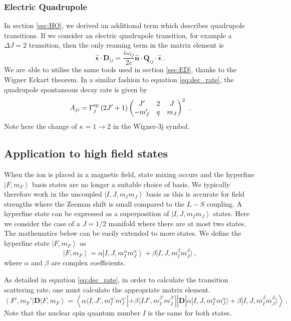 \documentclass{article}
\begin{document}
\subsubsection{Electric Quadrupole}
In section \ref{sec:HO}, we derived an additional term which describes quadrupole transitions. If we consider an electric quadrupole transition, for example a $\Delta J = 2$ transition, then the only reaming term in the matrix element is
\begin{equation}
    \boldsymbol{\hat{\epsilon}}\cdot\mathbf{D}_{ij} = \frac{i\omega_{ij}}{2c}\boldsymbol{\hat{n}}\cdot\mathbf{Q}_{ij}\cdot \boldsymbol{\hat{\epsilon}}~.
\end{equation}
We are able to utilise the same tools used in section \ref{sec:ED}, thanks to the Wigner Eckart theorem. In a similar fashion to equation \ref{eq:dec_rate}, the quadrupole spontaneous decay rate is given by 
\begin{equation} 
    A_{ji} = \Gamma^{\rm{sp}}_j \left(2J'+1\right)  \begin{pmatrix}
    J' & 2 & J\\
    -m_J' & q & m_J
    \end{pmatrix}^2~.
\end{equation}
Note here the change of $\kappa = 1 \rightarrow 2$ in the Wigner-3j symbol. 

\subsection{Application to high field states}
When the ion is placed in a magnetic field, state mixing occurs and the hyperfine $\left|F, m_F\right\rangle$ basis states are no longer a suitable choice of basis. We typically therefore work in the uncoupled $\left|I, J, m_I m_J\right\rangle$ basis as this is accurate for field strengths where the Zeeman shift is small compared to the $L-S$ coupling. A hyperfine state can be expressed as a superposition of $\left|I, J, m_I m_J\right\rangle$ states. Here we consider the case of a $J=1/2$ manifold where there are at most two states. The mathematics below can be easily extended to more states. We define the hyperfine state $\left|F, m_F\right\rangle$ as
\begin{equation}
    \left|F, m_F\right\rangle = \alpha \left|I, J, m_I^\alpha m_J^\alpha\right\rangle + \beta |I, J, m_I^\beta m_J^\beta\rangle~,
\end{equation}
where $\alpha$ and $\beta$ are complex coefficients. 

As detailed in equation \ref{eq:dec_rate}, in order to calculate the transition scattering rate, one must calculate the appropriate matrix element.  
\begin{equation}
    \left\langle F', m_F'\right|\mathbf{D}\left|F, m_F\right\rangle = \left\langle \alpha \langle I, J', m_I^{\alpha'} m_J^{\alpha'}| + \beta \langle I J', m_I^{\beta'} m_J^{\beta'}| \right|\mathbf{D}\left|\alpha |I, J, m_I^{\alpha} m_J^{\alpha}\rangle + \beta|I, J, m_I^{\beta} m_J^{\beta}\rangle\right\rangle~. 
\end{equation}
Note that the nuclear spin quantum number $I$ is the same for both states. 
\end{document}
